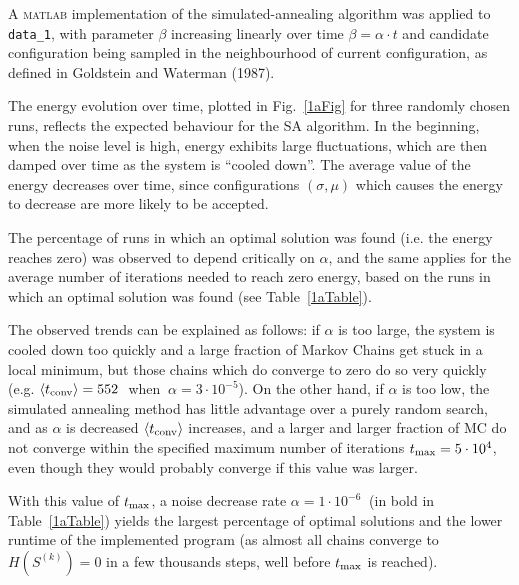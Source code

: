 \documentclass[12pt,A4,titlepage]{article}
\begin{document}

\bigskip
A \textsc{matlab} implementation of the simulated-annealing algorithm was applied to \verb!data_1!, with parameter $\beta$ increasing linearly over time $\beta = \alpha \cdot t$ and candidate configuration being sampled in the neighbourhood of current configuration, as defined in Goldstein and Waterman (1987). 

The energy evolution over time, plotted in Fig.~\ref{1aFig} for three randomly chosen runs, reflects the expected behaviour for the SA algorithm. In the beginning, when the noise level is high, energy exhibits large fluctuations, which are then damped over time as the system is ``cooled down''. The average value of the energy decreases over time, since configurations $(\sigma,\mu)$ which causes the energy to decrease are more likely to be accepted.

The percentage of runs in which an optimal solution was found (i.e. the energy reaches zero) was observed to depend critically on $\alpha$, and the same applies for the average number of iterations needed to reach zero energy, based on the runs in which an optimal solution was found (see Table~\ref{1aTable}). 

The observed trends can be explained as follows: if $\alpha$ is too large, the system is cooled down too quickly and a large fraction of Markov Chains get stuck in a local minimum, but those chains which do converge to zero do so very quickly (e.g. $\left<t_{\textup{conv}}\right> = 552 \ $ when $\ \alpha = 3\cdot10^{-5}$). On the other hand, if $\alpha$ is too low, the simulated annealing method has little advantage over a purely random search, and as $\alpha$ is decreased $\left<t_{\textup{conv}}\right>$ increases, and a larger and larger fraction of MC do not converge within the specified maximum number of iterations $t_{\textup{max}} = 5\cdot10^4$, even though they would probably converge if this value was larger.

With this value of $t_{\textup{max}}$, a noise decrease rate $\alpha = 1\cdot10^{-6} \ $ (in bold in Table~\ref{1aTable}) yields the largest percentage of optimal solutions and the lower runtime of the implemented program (as almost all chains converge to $H(S^{(k)}) = 0$ in a few thousands steps, well before $t_{\textup{max}}$ is reached).

\vspace*{-0.2cm}
\end{document}
